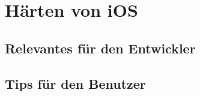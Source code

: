 \section{Härten von iOS}
	\subsection{Relevantes für den Entwickler}
	\subsection{Tips für den Benutzer}